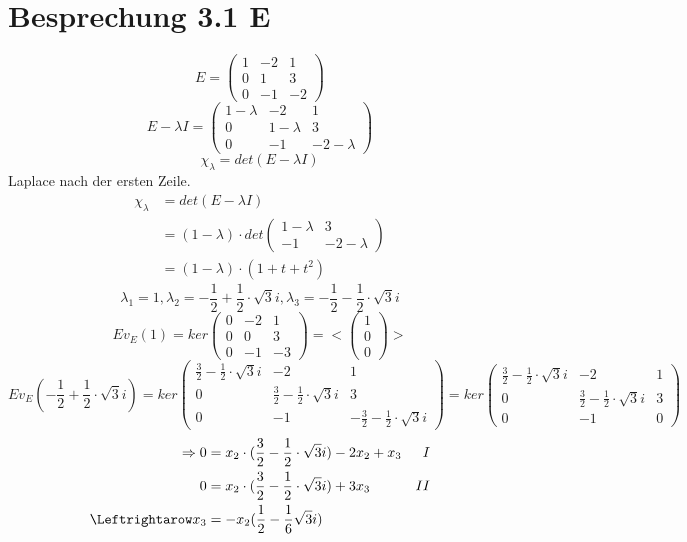 \documentclass{article} %
\begin{document}
\section*{Besprechung 3.1 E}
\[
 E = \begin{pmatrix}
 1 &-2&1 \\
 0&1&3\\
 0&-1&-2
 \end{pmatrix}
\]
\[
 E-\lambda I = \begin{pmatrix}
 1 -\lambda  &-2&1 \\
 0&1-\lambda &3\\
 0&-1&-2-\lambda 
 \end{pmatrix}
\]
\[
\chi_{\lambda} = det(E-\lambda I) 
\]
Laplace nach der ersten Zeile. 
\begin{align*}
    \chi_{\lambda} & = det(E-\lambda I) \\
    & = (1-\lambda) \cdot det \begin{pmatrix} 1- \lambda & 3 \\ -1 & -2- \lambda \end{pmatrix} \\
     & = (1-\lambda) \cdot (1+t+t^2) 
\end{align*}
\[
\lambda_1 = 1, \lambda_2 = -\frac{1}{2} + \frac{1}{2} \cdot \sqrt{3}i, \lambda_3 = -\frac{1}{2} - \frac{1}{2} \cdot \sqrt{3}i
\]
\[
E v_E(1) = ker \begin{pmatrix}
0 &-2&1 \\
 0&0&3\\
 0&-1&-3 
 \end{pmatrix} = < \begin{pmatrix} 1 \\ 0 \\ 0 \end{pmatrix} >
\]
\[
E v_E ( -\frac{1}{2} + \frac{1}{2} \cdot \sqrt{3}i) = ker \begin{pmatrix}
\frac{3}{2} - \frac{1}{2} \cdot \sqrt{3}i &-2&1 \\
 0&\frac{3}{2} - \frac{1}{2} \cdot \sqrt{3}i&3\\
 0&-1&-\frac{3}{2} - \frac{1}{2} \cdot \sqrt{3}i
 \end{pmatrix}  = ker \begin{pmatrix}
\frac{3}{2} - \frac{1}{2} \cdot \sqrt{3}i &-2&1 \\
 0&\frac{3}{2} - \frac{1}{2} \cdot \sqrt{3}i&3\\
 0&-1&0
 \end{pmatrix} 
\]
\begin{align*}
    \Rightarrow 0 & =  x_2  \cdot (\frac{3}{2} - \frac{1}{2} \cdot \sqrt{3}i) - 2x_2 + x_3 & I \\
    0  & = x_2  \cdot (\frac{3}{2} - \frac{1}{2} \cdot \sqrt{3}i) + 3x_3 & II \\
    \Leftrightarow x_3 & = -x_2 (\frac{1}{2} - \frac{1}{6} \sqrt{3}i) 
\end{align*}
\end{document}
